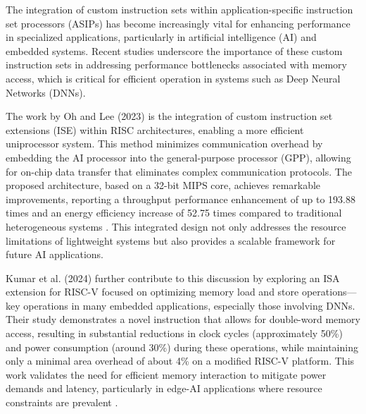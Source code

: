 The integration of custom instruction sets within application-specific instruction set processors (ASIPs) has become increasingly vital for enhancing performance in specialized applications, particularly in artificial intelligence (AI) and embedded systems. Recent studies underscore the importance of these custom instruction sets in addressing performance bottlenecks associated with memory access, which is critical for efficient operation in systems such as Deep Neural Networks (DNNs).

The work by Oh and Lee (2023) is the integration of custom instruction set extensions (ISE) within RISC architectures, enabling a more efficient uniprocessor system. This method minimizes communication overhead by embedding the AI processor into the general-purpose processor (GPP), allowing for on-chip data transfer that eliminates complex communication protocols. The proposed architecture, based on a 32-bit MIPS core, achieves remarkable improvements, reporting a throughput performance enhancement of up to 193.88 times and an energy efficiency increase of 52.75 times compared to traditional heterogeneous systems \cite{oh2023design}. This integrated design not only addresses the resource limitations of lightweight systems but also provides a scalable framework for future AI applications.


Kumar et al. (2024) further contribute to this discussion by exploring an ISA extension for RISC-V focused on optimizing memory load and store operations—key operations in many embedded applications, especially those involving DNNs. Their study demonstrates a novel instruction that allows for double-word memory access, resulting in substantial reductions in clock cycles (approximately 50\%) and power consumption (around 30\%) during these operations, while maintaining only a minimal area overhead of about 4\% on a modified RISC-V platform. This work validates the need for efficient memory interaction to mitigate power demands and latency, particularly in edge-AI applications where resource constraints are prevalent \cite{kumar2024implementation}.

